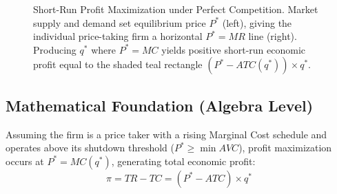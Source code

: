 \documentclass[11pt,letterpaper]{article}
\begin{document}
\begin{figure}[htbp]
\caption{Short-Run Profit Maximization under Perfect Competition. Market supply and demand set equilibrium price $P^*$ (left), giving the individual price-taking firm a horizontal $P^* = MR$ line (right). Producing $q^*$ where $P^* = MC$ yields positive short-run economic profit equal to the shaded teal rectangle $(P^* - ATC(q^*)) \times q^*$.}
\label{fig:pc_short_run_profit}
\end{figure}

\subsection*{Mathematical Foundation (Algebra Level)}
Assuming the firm is a price taker with a rising Marginal Cost schedule and operates above its shutdown threshold ($P^* \ge \min AVC$), profit maximization occurs at $P^* = MC(q^*)$, generating total economic profit:
\begin{equation}
\pi = TR - TC = (P^* - ATC) \times q^*
\end{equation}
\end{document}
